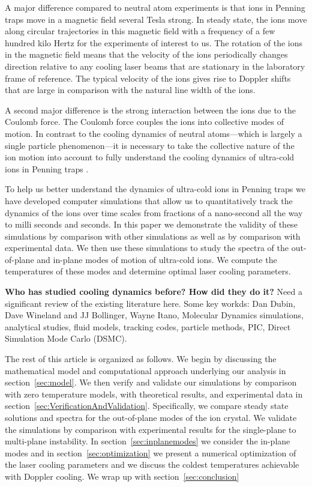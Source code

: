 \documentclass[aps, pra, preprint]{revtex4-1}
\begin{document}
A major difference compared to neutral atom experiments is that
ions in Penning traps move in a magnetic field several Tesla
strong. In steady state, the ions move along circular
trajectories in this magnetic field with a frequency of a few
hundred kilo Hertz for the experiments of interest to us. The
rotation of the ions in the magnetic field means that the
velocity of the ions periodically changes direction relative to
any cooling laser beams that are stationary in the laboratory
frame of reference. The typical velocity of the ions gives rise
to Doppler shifts that are large in comparison with the natural
line width of the ions.

A second major difference is the strong interaction between the
ions due to the Coulomb force. The Coulomb force couples the ions
into collective modes of motion. In contrast to the cooling
dynamics of neutral atoms---which is largely a single particle
phenomenon---it is necessary to take the collective nature of the
ion motion into account to fully understand the cooling dynamics
of ultra-cold ions in Penning traps .

To help us better understand the dynamics of ultra-cold ions in
Penning traps we have developed computer simulations that allow
us to quantitatively track the dynamics of the ions over time
scales from fractions of a nano-second all the way to milli
seconds and seconds. In this paper we demonstrate the validity of
these simulations by comparison with other simulations as well as
by comparison with experimental data. We then use these
simulations to study the spectra of the out-of-plane and in-plane
modes of motion of ultra-cold ions. We compute the temperatures
of these modes and determine optimal laser cooling parameters.

{\bf Who has studied cooling dynamics before? How did they do
it?} Need a significant review of the existing literature here.
Some key workds: Dan Dubin, Dave Wineland and JJ Bollinger, Wayne
Itano, Molecular Dynamics simulations, analytical studies, fluid
models, tracking codes, particle methods, PIC, Direct Simulation
Mode Carlo (DSMC).

The rest of this article is organized as follows. We begin by
discussing the mathematical model and computational approach
underlying our analysis in section~\ref{sec:model}. We then
verify and validate our simulations by comparison with zero
temperature models, with theoretical results, and experimental
data in section~\ref{sec:VerificationAndValidation}.
Specifically, we compare steady state solutions and spectra for
the out-of-plane modes of the ion crystal. We validate the
simulations by comparison with experimental results for the
single-plane to multi-plane instability. In
section~\ref{sec:inplanemodes} we consider the in-plane modes and
in section~\ref{sec:optimization} we present a numerical
optimization of the laser cooling parameters and we discuss the
coldest temperatures achievable with Doppler cooling. We wrap up
with section~\ref{sec:conclusion}
\end{document}

